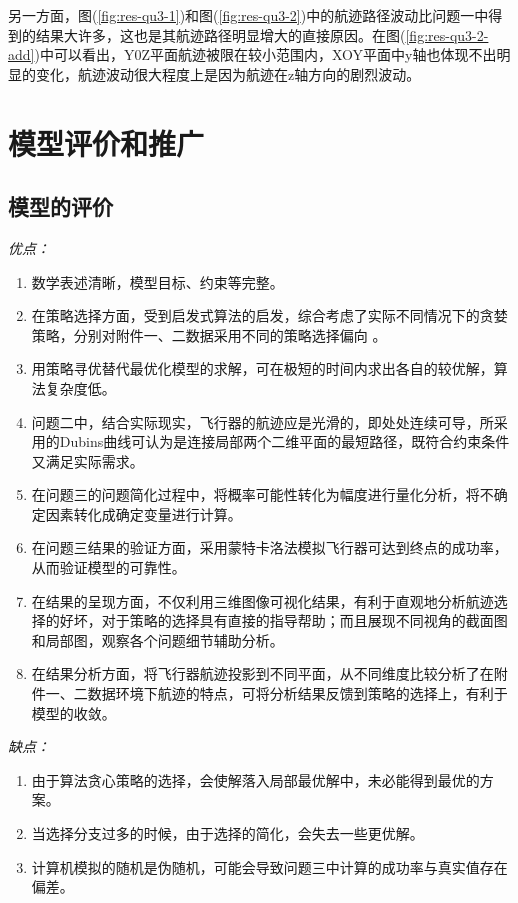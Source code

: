 另一方面，图(\ref{fig:res-qu3-1})和图(\ref{fig:res-qu3-2})中的航迹路径波动比问题一中得到的结果大许多，这也是其航迹路径明显增大的直接原因。在图(\ref{fig:res-qu3-2-add})中可以看出，Y0Z平面航迹被限在较小范围内，XOY平面中y轴也体现不出明显的变化，航迹波动很大程度上是因为航迹在z轴方向的剧烈波动。












\newpage
\section{模型评价和推广}
\subsection{模型的评价}

\noindent \emph{优点：}
\begin{enumerate}
    \item 数学表述清晰，模型目标、约束等完整。
    \item 在策略选择方面，受到启发式算法的启发，综合考虑了实际不同情况下的贪婪策略，分别对附件一、二数据采用不同的策略选择偏向 。
    \item 用策略寻优替代最优化模型的求解，可在极短的时间内求出各自的较优解，算法复杂度低。
    \item 问题二中，结合实际现实，飞行器的航迹应是光滑的，即处处连续可导，所采用的Dubins曲线可认为是连接局部两个二维平面的最短路径，既符合约束条件又满足实际需求。
    \item 在问题三的问题简化过程中，将概率可能性转化为幅度进行量化分析，将不确定因素转化成确定变量进行计算。
    \item 在问题三结果的验证方面，采用蒙特卡洛法模拟飞行器可达到终点的成功率，从而验证模型的可靠性。
    \item 在结果的呈现方面，不仅利用三维图像可视化结果，有利于直观地分析航迹选择的好坏，对于策略的选择具有直接的指导帮助；而且展现不同视角的截面图和局部图，观察各个问题细节辅助分析。	
	\item 在结果分析方面，将飞行器航迹投影到不同平面，从不同维度比较分析了在附件一、二数据环境下航迹的特点，可将分析结果反馈到策略的选择上，有利于模型的收敛。
\end{enumerate}

\noindent \emph{缺点：}
\begin{enumerate}
    \item 由于算法贪心策略的选择，会使解落入局部最优解中，未必能得到最优的方案。
	\item 当选择分支过多的时候，由于选择的简化，会失去一些更优解。
	\item 计算机模拟的随机是伪随机，可能会导致问题三中计算的成功率与真实值存在偏差。
\end{enumerate}

